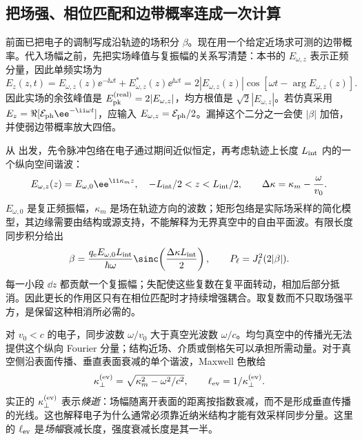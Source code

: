 \subsection{把场强、相位匹配和边带概率连成一次计算}
\label{sec:electron-pinem-field-calibration}

前面已把电子的调制写成沿轨迹的场积分 $\beta$。现在用一个给定近场求可测的边带概率。代入场幅之前，先把实场峰值与复振幅的关系写清楚：本书的 $E_{\omega,z}$ 表示正频分量，因此单频实场为
\begin{equation}
 E_z(z,t)=E_{\omega,z}(z)\ee^{-\ii\omega t}
           +E_{\omega,z}^*(z)\ee^{\ii\omega t}
 =2|E_{\omega,z}(z)|\cos[\omega t-\arg E_{\omega,z}(z)].
 \label{eq:electron-real-field-positive-frequency}
\end{equation}
因此实场的余弦峰值是 $E_{\rm pk}^{\rm(real)}=2|E_{\omega,z}|$，均方根值是 $\sqrt2|E_{\omega,z}|$。若仿真采用 $E_z=\Re[\mathcal E_{\rm ph}\ee^{-\ii\omega t}]$，应输入 $E_{\omega,z}=\mathcal E_{\rm ph}/2$。漏掉这个二分之一会使 $|\beta|$ 加倍，并使弱边带概率放大四倍。

从 出发，先令脉冲包络在电子通过期间近似恒定，再考虑轨迹上长度 $L_{\rm int}$ 内的一个纵向空间谐波：
\begin{equation*}
 E_{\omega,z}(z)=E_{\omega,0}\ee^{\ii\kappa_m z},\quad
 -L_{\rm int}/2<z<L_{\rm int}/2,
 \qquad \Delta\kappa=\kappa_m-\frac{\omega}{v_0}.
\end{equation*}
$E_{\omega,0}$ 是复正频振幅，$\kappa_m$ 是场在轨迹方向的波数；矩形包络是实际场采样的简化模型，其边缘需要由结构或源支持，不能解释为无界真空中的自由平面波。有限长度同步积分给出
\begin{equation}
 \beta=\frac{q_{\mathrm e} E_{\omega,0}L_{\rm int}}{\hbar\omega}
 \sinc\!\left(\frac{\Delta\kappa L_{\rm int}}2\right),\qquad
 P_\ell=J_\ell^2(2|\beta|).
 \label{eq:electron-rectangular-nearfield-beta}
\end{equation}
每一小段 $\dd z$ 都贡献一个复振幅；失配使这些复数在复平面转动，相加后部分抵消。因此更长的作用区只有在相位匹配时才持续增强耦合。取复数而不只取场强平方，是保留这种相消所必需的。

对 $v_0<c$ 的电子，同步波数 $\omega/v_0$ 大于真空光波数 $\omega/c$。均匀真空中的传播光无法提供这个纵向 Fourier 分量；结构近场、介质或倒格矢可以承担所需动量。对于真空侧沿表面传播、垂直表面衰减的单个谐波，Maxwell 色散给
\begin{equation*}
 \kappa_\perp^{\rm(ev)}=\sqrt{\kappa_m^2-\omega^2/c^2},\qquad
 \ell_{\rm ev}=1/\kappa_\perp^{\rm(ev)}.
\end{equation*}
实正的 $\kappa_\perp^{\rm(ev)}$ 表示\emph{倏逝}：场幅随离开表面的距离按指数衰减，而不是形成垂直传播的光线。这也解释电子为什么通常必须靠近纳米结构才能有效采样同步分量。这里的 $\ell_{\rm ev}$ 是\emph{场幅}衰减长度，强度衰减长度是其一半。

